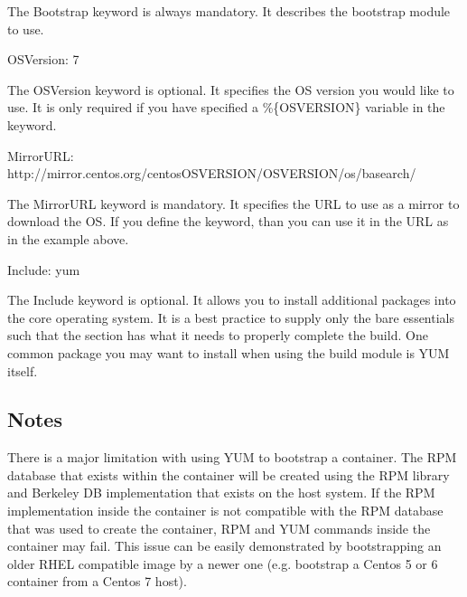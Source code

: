 \documentclass[letterpaper,10pt,english]{sphinxmanual}
\begin{document}
The Bootstrap keyword is always mandatory. It describes the bootstrap module to use.

%
\begin{sphinxVerbatim}[commandchars=\\\{\}]
OSVersion: 7
\end{sphinxVerbatim}

The OSVersion keyword is optional. It specifies the OS version you would like to use. It is only required if you have specified a \%\{OSVERSION\}
variable in the  keyword.

%
\begin{sphinxVerbatim}[commandchars=\\\{\}]
MirrorURL: http://mirror.centos.org/centos\PYGZhy{}\PYGZpc{}\PYGZob{}OSVERSION\PYGZcb{}/\PYGZpc{}\PYGZob{}OSVERSION\PYGZcb{}/os/\PYGZdl{}basearch/
\end{sphinxVerbatim}

The MirrorURL keyword is mandatory. It specifies the URL to use as a mirror to download the OS. If you define the  keyword, than you
can use it in the URL as in the example above.

%
\begin{sphinxVerbatim}[commandchars=\\\{\}]
Include: yum
\end{sphinxVerbatim}

The Include keyword is optional. It allows you to install additional packages into the core operating system. It is a best practice to supply
only the bare essentials such that the  section has what it needs to properly complete the build. One common package you may want to install
when using the  build module is YUM itself.


\subsection{Notes}
\label{\detokenize{appendix:id13}}
There is a major limitation with using YUM to bootstrap a container. The RPM database that exists within the container will be created using the
RPM library and Berkeley DB implementation that exists on the host system. If the RPM implementation inside the container is not compatible with
the RPM database that was used to create the container, RPM and YUM commands inside the container may fail. This issue can be easily demonstrated
by bootstrapping an older RHEL compatible image by a newer one (e.g. bootstrap a Centos 5 or 6 container from a Centos 7 host).
\end{document}
